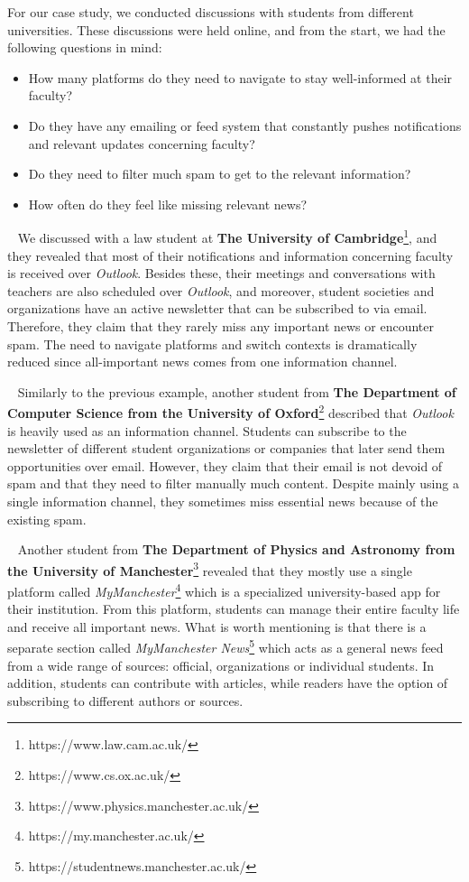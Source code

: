 For our case study, we conducted discussions with students from different universities. These discussions were held online, and from the start, we had the following questions in mind:

\begin{itemize}
    \setlength{\topsep}{0.5pt}
    \setlength{\itemsep}{0.5pt}
    \setlength{\parsep}{0.5pt}
    \item How many platforms do they need to navigate to stay well-informed at their faculty?
    \item  Do they have any emailing or feed system that constantly pushes notifications and relevant updates concerning faculty?
    \item Do they need to filter much spam to get to the relevant information?
    \item How often do they feel like missing relevant news?
\end{itemize}

~
We discussed with a law student at \textbf{The University of Cambridge}\footnote{https://www.law.cam.ac.uk/}, and they revealed that most of their notifications and information concerning faculty is received over \textit{Outlook}. Besides these, their meetings and conversations with teachers are also scheduled over \textit{Outlook}, and moreover, student societies and organizations have an active newsletter that can be subscribed to via email. Therefore, they claim that they rarely miss any important news or encounter spam. The need to navigate platforms and switch contexts is dramatically reduced since all-important news comes from one information channel.

~
Similarly to the previous example, another student from \textbf{The Department of Computer Science from the University of Oxford}\footnote{https://www.cs.ox.ac.uk/} described that \textit{Outlook} is heavily used as an information channel. Students can subscribe to the newsletter of different student organizations or companies that later send them opportunities over email. However, they claim that their email is not devoid of spam and that they need to filter manually much content. Despite mainly using a single information channel, they sometimes miss essential news because of the existing spam.

~
Another student from \textbf{The Department of Physics and Astronomy from the University of Manchester}\footnote{https://www.physics.manchester.ac.uk/} revealed that they mostly use a single platform called \textit{MyManchester}\footnote{https://my.manchester.ac.uk/} which is a specialized university-based app for their institution. From this platform, students can manage their entire faculty life and receive all important news. What is worth mentioning is that there is a separate section called \textit{MyManchester News}\footnote{https://studentnews.manchester.ac.uk/} which acts as a general news feed from a wide range of sources: official, organizations or individual students. In addition, students can contribute with articles, while readers have the option of subscribing to different authors or sources.

